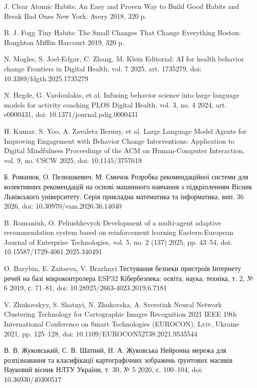 

\bibitemieee
{J. Clear}
{Atomic Habits: An Easy and Proven Way to Build Good Habits and Break Bad Ones}
{New York: Avery}
{2018, 320 p.}

\bibitemieee
{B. J. Fogg}
{Tiny Habits: The Small Changes That Change Everything}
{Boston: Houghton Mifflin Harcourt}
{2019, 320 p.}

\bibitemieee
{N. Mogles, S. Joel-Edgar, C. Zhang, M. Klein}
{Editorial: AI for health behavior change}
{Frontiers in Digital Health, vol. 7}
{2025, art. 1735279, doi: 10.3389/fdgth.2025.1735279}

\bibitemieee
{N. Hegde, G. Vardoulakis, et al.}
{Infusing behavior science into large language models for activity coaching}
{PLOS Digital Health, vol. 3, no. 4}
{2024, art. e0000431, doi: 10.1371/journal.pdig.0000431}

\bibitemieee
{H. Kumar, S. Yoo, A. Zavaleta Bernuy, et al.}
{Large Language Model Agents for Improving Engagement with Behavior Change Interventions: Application to Digital Mindfulness}
{Proceedings of the ACM on Human-Computer Interaction, vol. 9, no. CSCW}
{2025, doi: 10.1145/3757619}

\bibitemieee
{Б. Романюк, О. Пелюшкевич, М. Смичок}
{Розробка рекомендаційної системи для колективних рекомендацій на основі машинного навчання з підкріпленням}
{Вісник Львівського університету. Серія прикладна математика та інформатика, вип. 36}
{2026, doi: 10.30970/vam.2026.36.14040}

\bibitemieee
{B. Romaniuk, O. Peliushkevych}
{Development of a multi-agent adaptive recommendation system based on reinforcement learning}
{Eastern-European Journal of Enterprise Technologies, vol. 5, no. 2 (137)}
{2025, pp. 43--54, doi: 10.15587/1729-4061.2025.340491}

\bibitemieee
{O. Barybin, E. Zaitseva, V. Brazhnyi}
{Тестування безпеки пристроїв Інтернету речей на базі мікроконтролера ESP32}
{Кібербезпека: освіта, наука, техніка, т. 2, № 6}
{2019, с. 71--81, doi: 10.28925/2663-4023.2019.6.7181}

\bibitemieee
{V. Zhukovskyy, S. Shatnyi, N. Zhukovska, A. Sverstiuk}
{Neural Network Clustering Technology for Cartographic Images Recognition}
{2021 IEEE 19th International Conference on Smart Technologies (EUROCON), Lviv, Ukraine}
{2021, pp. 125--128, doi: 10.1109/EUROCON52738.2021.9535544}

\bibitemieee
{В. В. Жуковський, С. В. Шатний, Н. А. Жуковська}
{Нейронна мережа для розпізнавання та класифікації картографічних зображень ґрунтових масивів}
{Науковий вісник НЛТУ України, т. 30, № 5}
{2020, с. 100--104, doi: 10.36930/40300517}


